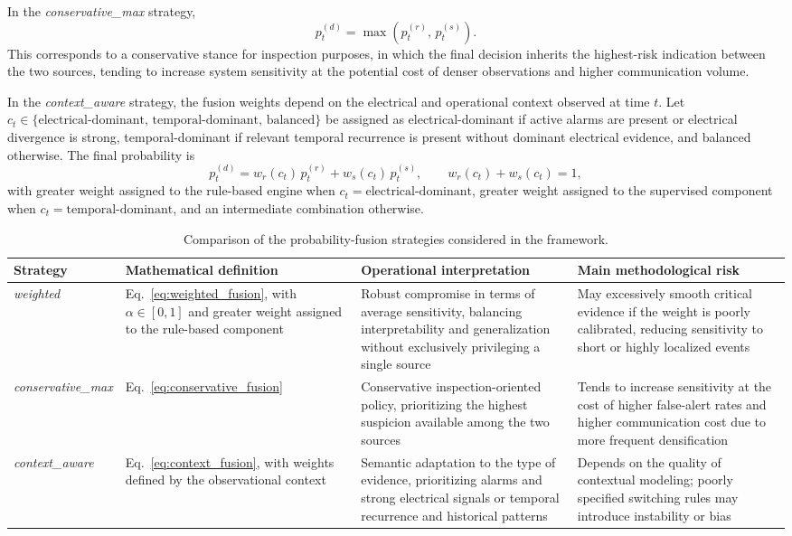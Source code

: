 \documentclass{ieeeaccess}
\begin{document}
In the \textit{conservative\_max} strategy,
\begin{equation}
p_t^{(d)} = \max\left(p_t^{(r)},\, p_t^{(s)}\right).
\label{eq:conservative_fusion}
\end{equation}
This corresponds to a conservative stance for inspection purposes, in which the final decision inherits the highest-risk indication between the two sources, tending to increase system sensitivity at the potential cost of denser observations and higher communication volume.

In the \textit{context\_aware} strategy, the fusion weights depend on the electrical and operational context observed at time $t$. Let $c_t \in \{\text{electrical-dominant},\, \text{temporal-dominant},\, \text{balanced}\}$ be assigned as electrical-dominant if active alarms are present or electrical divergence is strong, temporal-dominant if relevant temporal recurrence is present without dominant electrical evidence, and balanced otherwise. The final probability is
\begin{equation}
p_t^{(d)} = w_r(c_t)\, p_t^{(r)} + w_s(c_t)\, p_t^{(s)}, \qquad w_r(c_t) + w_s(c_t) = 1,
\label{eq:context_fusion}
\end{equation}
with greater weight assigned to the rule-based engine when $c_t = \text{electrical-dominant}$, greater weight assigned to the supervised component when $c_t = \text{temporal-dominant}$, and an intermediate combination otherwise.

\begin{table}[ht]
\centering
\caption{Comparison of the probability-fusion strategies considered in the framework.}
\label{tab:fusion_strategies}
\begin{tabular}{p{2.0cm} p{4.2cm} p{4.4cm} p{4.6cm}}
\hline
\textbf{Strategy} & \textbf{Mathematical definition} & \textbf{Operational interpretation} & \textbf{Main methodological risk} \\
\hline
\textit{weighted} & Eq.~\eqref{eq:weighted_fusion}, with $\alpha \in [0,1]$ and greater weight assigned to the rule-based component & Robust compromise in terms of average sensitivity, balancing interpretability and generalization without exclusively privileging a single source & May excessively smooth critical evidence if the weight is poorly calibrated, reducing sensitivity to short or highly localized events \\
\textit{conservative\_max} & Eq.~\eqref{eq:conservative_fusion} & Conservative inspection-oriented policy, prioritizing the highest suspicion available among the two sources & Tends to increase sensitivity at the cost of higher false-alert rates and higher communication cost due to more frequent densification \\
\textit{context\_aware} & Eq.~\eqref{eq:context_fusion}, with weights defined by the observational context & Semantic adaptation to the type of evidence, prioritizing alarms and strong electrical signals or temporal recurrence and historical patterns & Depends on the quality of contextual modeling; poorly specified switching rules may introduce instability or bias \\
\hline
\end{tabular}
\end{table}
\end{document}
